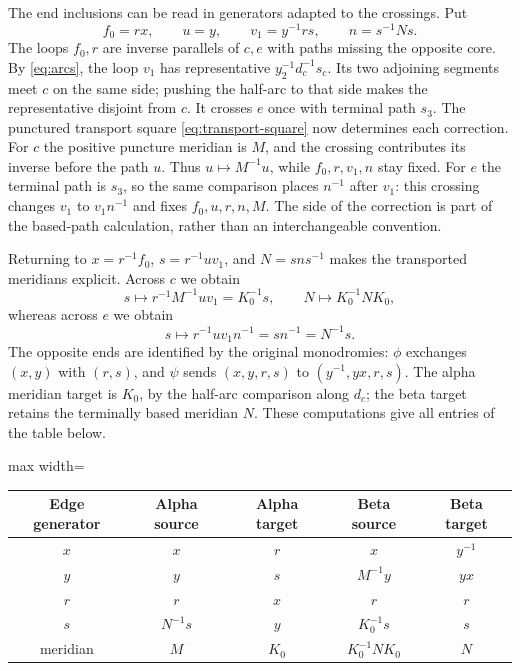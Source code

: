 \documentclass[11pt]{amsart}
\theoremstyle{definition}
\theoremstyle{remark}
\begin{document}
The end inclusions can be read in generators adapted to the
crossings. Put
\[
 f_0=rx,\qquad u=y,\qquad v_1=y^{-1}rs,\qquad n=s^{-1}Ns.
\]
The loops $f_0,r$ are inverse parallels of $c,e$ with paths
missing the opposite core. By \eqref{eq:arcs}, the loop $v_1$
has representative $y_2^{-1}d_c^{-1}s_c$. Its two adjoining
segments meet $c$ on the same side; pushing the half-arc to that
side makes the representative disjoint from $c$. It crosses $e$
once with terminal path $s_3$.
The punctured transport square \eqref{eq:transport-square} now
determines each correction. For $c$ the positive puncture meridian
is $M$, and the crossing contributes its inverse before the path
$u$. Thus $u\mapsto M^{-1}u$, while $f_0,r,v_1,n$ stay fixed.
For $e$ the terminal path is $s_3$, so the same comparison places
$n^{-1}$ after $v_1$: this crossing changes $v_1$ to $v_1n^{-1}$
and fixes $f_0,u,r,n,M$. The side of the correction is part of
the based-path calculation, rather than an interchangeable convention.

Returning to $x=r^{-1}f_0$, $s=r^{-1}uv_1$, and $N=sns^{-1}$
makes the transported meridians explicit. Across $c$ we obtain
\[
 s\longmapsto r^{-1}M^{-1}uv_1=K_0^{-1}s,
 \qquad N\longmapsto K_0^{-1}NK_0,
\]
whereas across $e$ we obtain
\[
 s\longmapsto r^{-1}uv_1n^{-1}=sn^{-1}=N^{-1}s.
\]
The opposite ends are identified by the original monodromies:
$\phi$ exchanges $(x,y)$ with $(r,s)$, and $\psi$ sends
$(x,y,r,s)$ to $(y^{-1},yx,r,s)$. The alpha meridian target is
$K_0$, by the half-arc comparison along $d_c$; the beta target
retains the terminally based meridian $N$. These computations give
all entries of the table below.

\begin{center}
\begin{adjustbox}{max width=\textwidth}
\begin{tabular}{ccccc}
\toprule
Edge generator&Alpha source&Alpha target&Beta source&Beta target\\
\midrule
$x$&$x$&$r$&$x$&$y^{-1}$\\
$y$&$y$&$s$&$M^{-1}y$&$yx$\\
$r$&$r$&$x$&$r$&$r$\\
$s$&$N^{-1}s$&$y$&$K_0^{-1}s$&$s$\\
meridian&$M$&$K_0$&$K_0^{-1}NK_0$&$N$\\
\bottomrule
\end{tabular}
\end{adjustbox}
\end{center}
\end{document}
